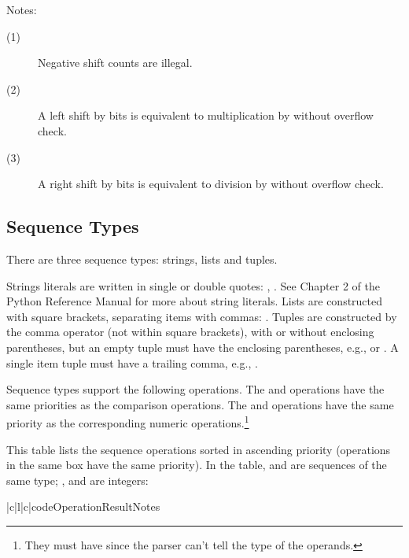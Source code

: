\noindent
Notes:
\begin{description}
\item[(1)] Negative shift counts are illegal.
\item[(2)] A left shift by  bits is equivalent to
multiplication by  without overflow check.
\item[(3)] A right shift by  bits is equivalent to
division by  without overflow check.
\end{description}

\subsection{Sequence Types}

There are three sequence types: strings, lists and tuples.

Strings literals are written in single or double quotes:
, .  See Chapter 2 of the Python
Reference Manual for more about string literals.  Lists are
constructed with square brackets, separating items with commas:
\code{[a, b, c]}.  Tuples are constructed by the comma operator (not
within square brackets), with or without enclosing parentheses, but an
empty tuple must have the enclosing parentheses, e.g.,
 or \code{()}.  A single item tuple must have a trailing
comma, e.g., .

Sequence types support the following operations.  The  and
 operations have the same priorities as the comparison
operations.  The \samp{+} and \samp{*} operations have the same
priority as the corresponding numeric operations.\footnote{They must
have since the parser can't tell the type of the operands.}

This table lists the sequence operations sorted in ascending priority
(operations in the same box have the same priority).  In the table,
 and  are sequences of the same type; , 
and  are integers:

\begin{tableiii}{|c|l|c|}{code}{Operation}{Result}{Notes}
  \hline
  \hline
  \hline
  \hline
\end{tableiii}


